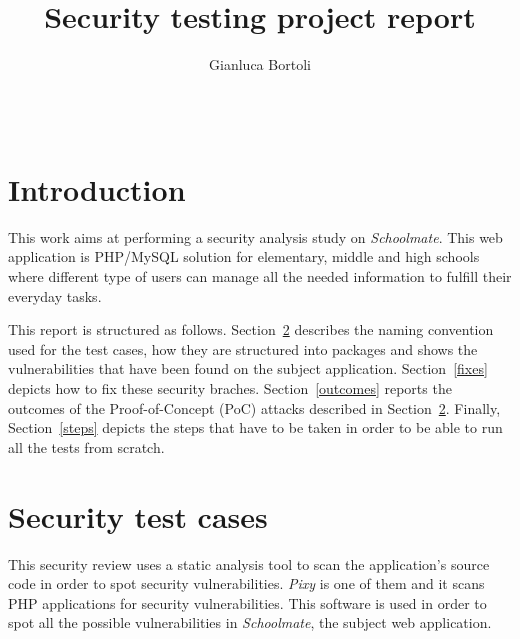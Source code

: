 \documentclass{sig-alternate-05-2015}
\begin{document}
\title{Security testing project report}

\author{
    Gianluca Bortoli\\
           \\
           \\
}
\maketitle


\section{Introduction}
This work aims at performing a security analysis study on \emph{Schoolmate}.
This web application is PHP/MySQL solution for elementary,
middle and high schools where different type of users can manage all the needed
information to fulfill their everyday tasks.

This report is structured as follows. Section~\ref{tests} describes the naming
convention used for the test cases, how they are structured into packages and shows
the vulnerabilities that have been found on the subject application.
Section~\ref{fixes} depicts how to fix these security braches. Section~\ref{outcomes}
reports the outcomes of the Proof-of-Concept (PoC) attacks described in Section~\ref{tests}.
Finally, Section~\ref{steps} depicts the steps that have to be taken in order to
be able to run all the tests from scratch.


\section{Security test cases}\label{tests}
This security review uses a static analysis tool to scan the application's source code
in order to spot security vulnerabilities.
\emph{Pixy} is one of them and it scans PHP applications for security vulnerabilities.
This software is used in order to spot all the possible vulnerabilities in \emph{Schoolmate},
the subject web application.
\end{document}
